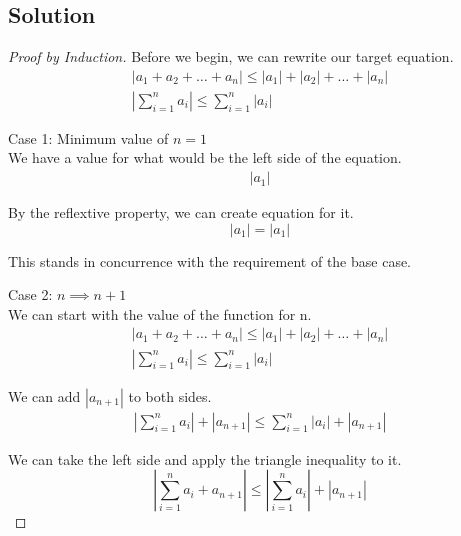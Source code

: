 \documentclass[12pt]{report}
\begin{document}
\subsection*{Solution}
\begin{proof}[Proof by Induction]
    Before we begin, we can rewrite our target equation.
    \begin{gather}
        \left| a_1 + a_2 + \dots + a_n \right| \le \left|a_1\right| + \left|a_2\right| + \dots + \left|a_n\right|\\
        \left|\sum_{i = 1}^{n} a_i\right| \leq \sum_{i = 1}^{n} \left| a_i \right|
    \end{gather}

    Case 1: Minimum value of $n = 1$\\
    We have a value for what would be the left side of the equation.
    \begin{gather}
        \left| a_1 \right|
    \end{gather}

    By the reflextive property, we can create equation for it.
    \begin{equation}
        \left| a_1 \right| = \left| a_1 \right|
    \end{equation}

    This stands in concurrence with the requirement of the base case.

    Case 2: $n \implies n + 1$\\
    We can start with the value of the function for n.
    \begin{gather}
        \left| a_1 + a_2 + \dots + a_n \right| \le \left|a_1\right| + \left|a_2\right| + \dots + \left|a_n\right|\\
        \left|\sum_{i = 1}^{n} a_i\right| \leq \sum_{i = 1}^{n} \left| a_i \right|
    \end{gather}

    We can add $\left| a_{n + 1} \right|$ to both sides.
    \begin{gather}
        \left|\sum_{i = 1}^{n} a_i\right| + \left| a_{n + 1} \right| \leq \sum_{i = 1}^{n} \left| a_i \right| + \left| a_{n + 1} \right|
    \end{gather}

    We can take the left side and apply the triangle inequality to it.
    \begin{equation}
        \left|\sum_{i = 1}^{n} a_i + a_{n + 1} \right| \leq \left|\sum_{i = 1}^{n} a_i\right| + \left| a_{n + 1} \right|
    \end{equation}


\end{proof}
\end{document}
